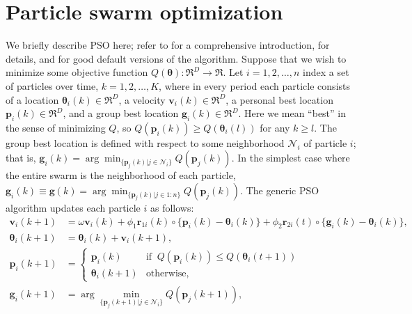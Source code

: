 \documentclass[cmbright]{staauth}
\begin{document}
\section{Particle swarm optimization}\label{sec:pso}
We briefly describe PSO here; refer to \citet{blum2008swarm} for a comprehensive introduction, \citet{clerc2010particle} for details, and \citet{clerc2011spso} for good default versions of the algorithm. Suppose that we wish to minimize some objective function $Q(\bm{\theta}):\Re^D\to\Re$. Let $i=1,2,\dots,n$ index a set of particles over time, $k=1,2,\dots,K$, where in every period each particle consists of a location $\bm{\theta}_i(k)\in \Re^D$, a velocity $\bm{v}_i(k) \in \Re^D$, a personal best location $\bm{p}_i(k)\in\Re^D$, and a group best location $\bm{g}_i(k)\in\Re^D$. Here we mean ``best'' in the sense of minimizing $Q$, so $Q(\bm{p}_i(k)) \geq Q(\bm{\theta}_i(l))$ for any $k\geq l$. The group best location is defined with respect to some neighborhood $\mathcal{N}_i$ of particle $i$; that is, $\bm{g}_i(k) = \arg\min_{\{\bm{p}_j(k)|j\in\mathcal{N}_i\}}Q(\bm{p}_j(k))$. In the simplest case where the entire swarm is the neighborhood of each particle, $\bm{g}_i(k)\equiv \bm{g}(k) = \arg\min_{\{\bm{p}_j(k)|j\in 1:n\}}Q(\bm{p}_j(k))$. The generic PSO algorithm updates each particle $i$ as follows:
\begin{align}\label{eq:pso}
\bm{v}_i(k+1) &= \omega \bm{v}_i(k) + \phi_1 \bm{r}_{1i}(k)\circ\{\bm{p}_i(k) - \bm{\theta}_i(k)\} + \phi_2 \bm{r}_{2i}(t)\circ\{\bm{g}_i(k) - \bm{\theta}_i(k)\},\nonumber\\
\bm{\theta}_i(k+1) &= \bm{\theta}_i(k) + \bm{v}_i(k+1),\nonumber\\
\bm{p}_i(k+1) &= \begin{cases} \bm{p}_i(k)   & \mbox{if }\  Q(\bm{p}_i(k)) \le Q(\bm{\theta}_i(t + 1))\\
                               \bm{\theta}_i(k+1) & \mbox{otherwise},
\end{cases}\nonumber\\
\bm{g}_i(k+1) &= \arg\min_{\{\bm{p}_j(k+1)|j\in\mathcal{N}_i\}}Q(\bm{p}_j(k+1)),
\end{align}
\end{document}

